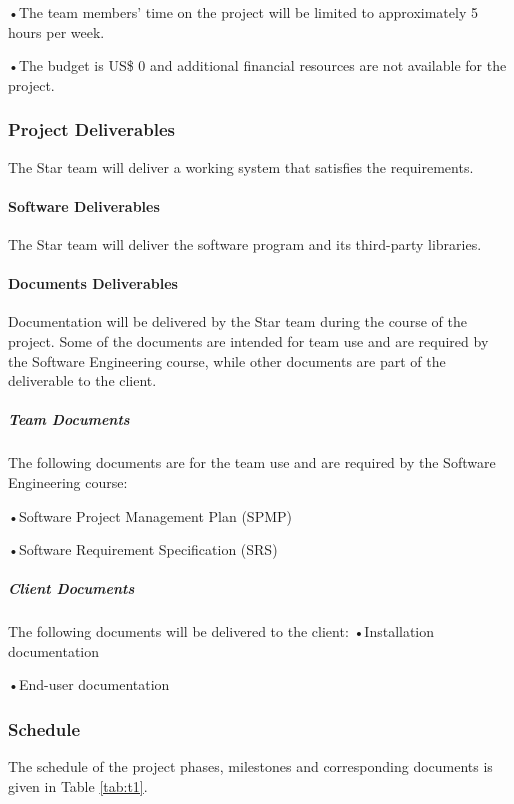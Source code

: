 \documentclass[12pt,letterpaper]{article}
\begin{document}
	•\enspace The team members' time on the project will be limited to approximately 5 hours per week.
	
	•\enspace The budget is US\$ 0 and additional financial resources are not available for the project.
	
	
	\subsubsection{Project Deliverables}
	
	The Star team will deliver a working system that satisfies the requirements.
	
	\paragraph{Software Deliverables}
	
	The Star team will deliver the software program and its third-party libraries.
	
	\paragraph{Documents Deliverables}
	
	Documentation will be delivered by the Star team during the course of the project. Some of the documents are intended for team use and are required by the Software Engineering course, while other documents are part of the deliverable to the client.
	
	
	\subparagraph{Team Documents}
	
	The following documents are for the team use and are required by the Software Engineering course:
	
	•\enspace Software Project Management Plan (SPMP)
	
	•\enspace Software Requirement Specification (SRS)
	
	
	\subparagraph{Client Documents}
	The following documents will be delivered to the client: 
	•\enspace Installation documentation
	
	•\enspace End-user documentation
	
	
	\subsubsection{Schedule}
	The schedule of the project phases, milestones and corresponding documents is given in Table \ref{tab:t1}.
	
\end{document}
